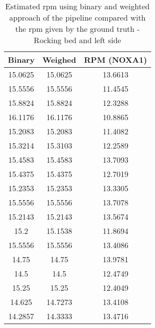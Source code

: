 \begin{table}[H]
    \centering
    \begin{tabular}{|c|c|c|}
    \hline 
    Binary & Weighed  & RPM (NOXA1) \\ 
    \hline
15.0625   &   15.0625    &  13.6613 \\ 
15.5556   &   15.5556    &  11.4545 \\ 
15.8824    &  15.8824    &  12.3288 \\ 
16.1176   &   16.1176   &   10.8865 \\ 
15.2083    &  15.2083   &   11.4082 \\ 
15.3214    &  15.3103   &   12.2589 \\ 
15.4583   &   15.4583    &  13.7093 \\ 
15.4375   &   15.4375   &   12.7019 \\ 
15.2353    &  15.2353  &    13.3305 \\ 
15.5556   &   15.5556  &    13.7078 \\ 
15.2143    &  15.2143   &   13.5674 \\ 
15.2    &  15.1538   &   11.8694 \\ 
15.5556    &  15.5556   &   13.4086 \\ 
14.75      &  14.75   &   13.9781 \\ 
14.5      &   14.5   &   12.4749 \\ 
15.25     &   15.25   &   12.4049 \\ 
14.625    &  14.7273   &   13.4108 \\ 
14.2857   &   14.3333   &   13.4716 \\ 
\hline 
    \end{tabular}
\caption{Estimated rpm using binary and weighted approach of the pipeline compared with the rpm given by the ground truth - Rocking bed and left side}
\label{tab:LeftMov}
\end{table}